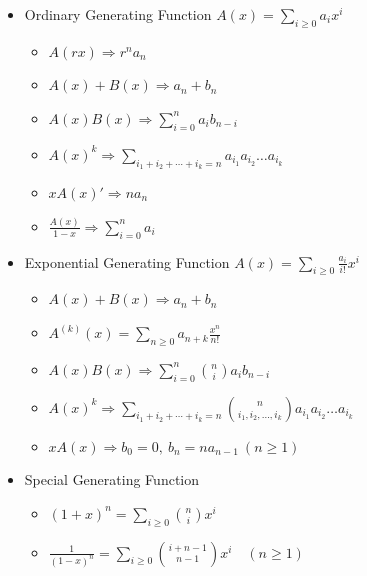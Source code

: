 \begin{itemize}\itemsep-0.3em
\item Ordinary Generating Function
$A(x) = \sum_{i\ge 0} a_ix^i$
\begin{itemize}\itemsep-0.3em
    \item $A(rx)             \Rightarrow r^na_n$
    \item $A(x) + B(x)       \Rightarrow a_n + b_n$
    \item $A(x)B(x)          \Rightarrow \sum_{i=0}^{n} a_ib_{n-i}$
    \item $A(x)^k            \Rightarrow \sum_{i_1+i_2+\cdots+i_k=n} a_{i_1}a_{i_2}\ldots a_{i_k}$
    \item $xA(x)'            \Rightarrow na_n$
    \item $\frac{A(x)}{1-x}  \Rightarrow \sum_{i=0}^{n} a_i$
\end{itemize}
\item Exponential Generating Function
$A(x) = \sum_{i\ge 0} \frac{a_i}{i!}x^i$
\begin{itemize}\itemsep-0.3em
    \item $A(x) + B(x)       \Rightarrow a_n + b_n$
    \item $A^{(k)}(x)        = \sum_{n\ge0}a_{n+k}\frac{x^n}{n!}$
    \item $A(x)B(x)          \Rightarrow \sum_{i=0}^{n} \binom{n}{i}a_ib_{n-i}$
    \item $A(x)^k            \Rightarrow \sum_{i_1+i_2+\cdots+i_k=n} \binom{n}{i_1, i_2, \ldots, i_k}a_{i_1}a_{i_2}\ldots a_{i_k}$
    \item $xA(x)             \Rightarrow b_0=0,\ b_n=na_{n-1}\ (n\ge1)$
\end{itemize}
\item Special Generating Function
\begin{itemize}\itemsep-0.3em
    \item $(1+x)^n           = \sum_{i\ge 0} \binom{n}{i}x^i$
    \item $\frac{1}{(1-x)^n} = \sum_{i\ge 0} \binom{i+n-1}{n-1}x^i\quad(n\ge1)$
\end{itemize}
\end{itemize}
